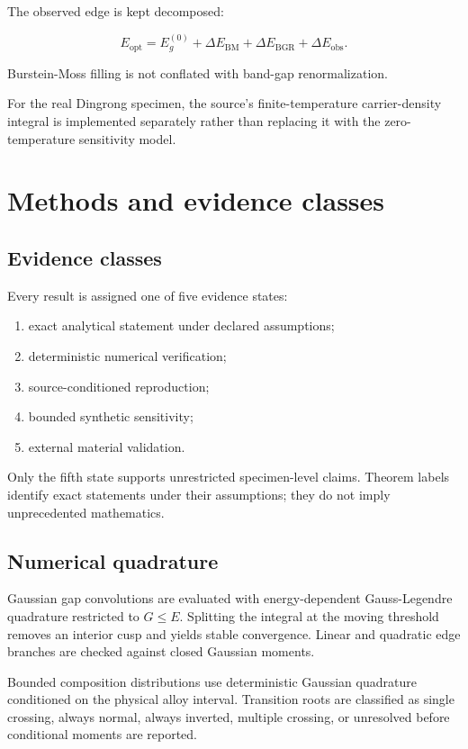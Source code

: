 \documentclass[12pt]{article}
\begin{document}
The observed edge is kept decomposed:

\[
E_{\mathrm{opt}}
=E_g^{(0)}
+\Delta E_{\mathrm{BM}}
+\Delta E_{\mathrm{BGR}}
+\Delta E_{\mathrm{obs}}.
\]

Burstein-Moss filling is not conflated with band-gap renormalization.

For the real Dingrong specimen, the source's finite-temperature carrier-density integral is implemented separately rather than replacing it with the zero-temperature sensitivity model.

\section{Methods and evidence classes}

\subsection{Evidence classes}

Every result is assigned one of five evidence states:

\begin{enumerate}
\item exact analytical statement under declared assumptions;
\item deterministic numerical verification;
\item source-conditioned reproduction;
\item bounded synthetic sensitivity;
\item external material validation.
\end{enumerate}

Only the fifth state supports unrestricted specimen-level claims. Theorem labels identify exact statements under their assumptions; they do not imply unprecedented mathematics.

\subsection{Numerical quadrature}

Gaussian gap convolutions are evaluated with energy-dependent Gauss-Legendre quadrature restricted to $G\le E$. Splitting the integral at the moving threshold removes an interior cusp and yields stable convergence. Linear and quadratic edge branches are checked against closed Gaussian moments.

Bounded composition distributions use deterministic Gaussian quadrature conditioned on the physical alloy interval. Transition roots are classified as single crossing, always normal, always inverted, multiple crossing, or unresolved before conditional moments are reported.
\end{document}

